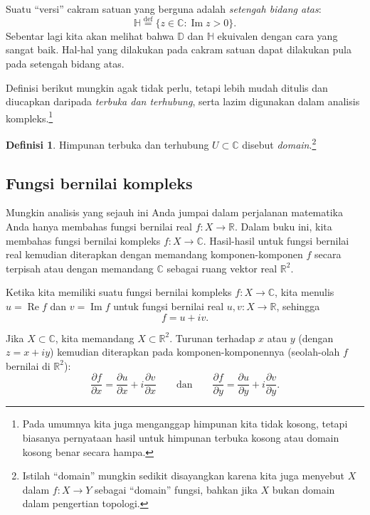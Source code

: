 \documentclass[12pt,openany]{book}
\renewcommand{\Re}{\operatorname{Re}}
\renewcommand{\Im}{\operatorname{Im}}
\newcommand{\C}{{\mathbb{C}}}
\newcommand{\R}{{\mathbb{R}}}
\newcommand{\D}{{\mathbb{D}}}
\newcommand{\bH}{{\mathbb{H}}}
\newcommand{\myindex}[1]{#1\index{#1}}
\newcommand{\myquote}[1]{``#1''}
\theoremstyle{plain}
\theoremstyle{remark}
\theoremstyle{definition}
\newtheorem{defn}[thm]{Definisi}
\theoremstyle{exercise}
\theoremstyle{example}
\begin{document}
Suatu \myquote{versi} cakram satuan yang berguna adalah \emph{\myindex{setengah bidang atas}}:
%
\begin{equation*}
\bH 
\overset{\text{def}}{=}
\bigl\{
z \in \C : \Im z > 0
\bigr\} .
\end{equation*}
Sebentar lagi kita akan melihat bahwa $\D$ dan $\bH$ ekuivalen dengan cara yang
sangat baik.
Hal-hal yang dilakukan pada cakram satuan dapat dilakukan pula pada setengah bidang atas.

Definisi berikut mungkin agak tidak perlu, tetapi lebih
mudah ditulis dan diucapkan daripada \emph{terbuka dan terhubung}, serta lazim
digunakan dalam analisis kompleks.\footnote{Pada umumnya kita juga menganggap himpunan kita
tidak kosong, tetapi biasanya pernyataan hasil untuk himpunan terbuka kosong atau
domain kosong benar secara hampa.}

\begin{defn}
Himpunan terbuka dan terhubung $U \subset \C$ disebut
\emph{\myindex{domain}}.\footnote{Istilah \myquote{domain} mungkin sedikit disayangkan karena
kita juga menyebut $X$ dalam $f \colon X \to Y$ sebagai \myquote{domain} fungsi,
bahkan jika $X$ bukan domain dalam pengertian topologi.}
\end{defn}

\subsection{Fungsi bernilai kompleks}

Mungkin analisis yang sejauh ini Anda jumpai dalam perjalanan
matematika Anda hanya membahas fungsi bernilai real $f \colon X \to \R$.  Dalam
buku ini, kita membahas fungsi bernilai kompleks $f \colon X \to \C$.
Hasil-hasil untuk fungsi bernilai real kemudian diterapkan dengan memandang
komponen-komponen $f$ secara terpisah atau dengan memandang $\C$ sebagai
ruang vektor real $\R^2$.

Ketika kita memiliki suatu fungsi bernilai kompleks
$f \colon X \to \C$, kita menulis $u = \Re f$
dan $v = \Im f$ untuk fungsi bernilai real $u,v \colon X \to \R$, sehingga
\begin{equation*}
f = u+iv .
\end{equation*}

Jika $X \subset \C$, kita memandang $X \subset \R^2$.
Turunan terhadap $x$ atau $y$ (dengan $z=x+iy$) kemudian diterapkan pada
komponen-komponennya (seolah-olah $f$ bernilai di $\R^2$):
\begin{equation*}
\frac{\partial f}{\partial x} = 
\frac{\partial u}{\partial x} + i
\frac{\partial v}{\partial x}
\qquad\text{dan}\qquad
\frac{\partial f}{\partial y} = 
\frac{\partial u}{\partial y} + i
\frac{\partial v}{\partial y} .
\end{equation*}
\end{document}
